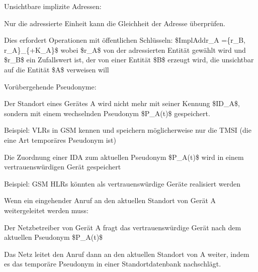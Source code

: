 \documentclass[a4paper]{article}
\begin{document}
\begin{multicols}{3}
\begin{itemize*}
\begin{itemize*}
\begin{itemize*}
                  \end{itemize*}
                  \item Unsichtbare implizite Adressen:
                  \begin{itemize*}
                        \item Nur die adressierte Einheit kann die Gleichheit der Adresse überprüfen.
                        \item Dies erfordert Operationen mit öffentlichen Schlüsseln: \$ImplAddr\_A =\{r\_B, r\_A\}\_\{+K\_A\}\$ wobei \$r\_A\$ von der adressierten Entität gewählt wird und \$r\_B\$ ein Zufallswert ist, der von einer Entität \$B\$ erzeugt wird, die unsichtbar auf die Entität \$A\$ verweisen will
                  \end{itemize*}
            \end{itemize*}
            \item Vorübergehende Pseudonyme:
            \begin{itemize*}
                  \item Der Standort eines Gerätes A wird nicht mehr mit seiner Kennung \$ID\_A\$, sondern mit einem wechselnden Pseudonym \$P\_A(t)\$ gespeichert.
                  \begin{itemize*}
                        \item Beispiel: VLRs in GSM kennen und speichern möglicherweise nur die TMSI (die eine Art temporäres Pseudonym ist)
                  \end{itemize*}
                  \item Die Zuordnung einer IDA zum aktuellen Pseudonym \$P\_A(t)\$ wird in einem vertrauenswürdigen Gerät gespeichert
                  \begin{itemize*}
                        \item Beispiel: GSM HLRs könnten als vertrauenswürdige Geräte realisiert werden
                  \end{itemize*}
                  \item Wenn ein eingehender Anruf an den aktuellen Standort von Gerät A weitergeleitet werden muss:
                  \begin{itemize*}
                        \item Der Netzbetreiber von Gerät A fragt das vertrauenswürdige Gerät nach dem aktuellen Pseudonym \$P\_A(t)\$
                        \item Das Netz leitet den Anruf dann an den aktuellen Standort von A weiter, indem es das temporäre Pseudonym in einer Standortdatenbank nachschlägt.

\end{itemize*}
\end{itemize*}
\end{itemize*}
\end{multicols}
\end{document}
